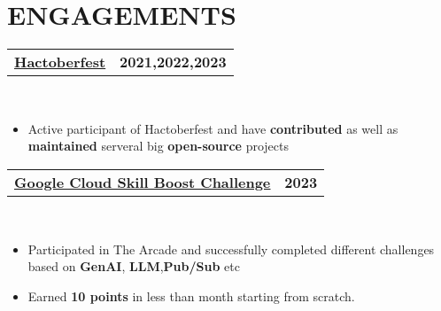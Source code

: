 \documentclass[letterpaper,11pt]{article}
\makeatletter
\newcommand{\resumeItem}[1]{
  \item\small{
    {#1 \vspace{-2pt}}
  }
}
\newcommand{\resumeProjectHeading}[2]{
    \item
    \begin{tabular*}{1.001\textwidth}{l@{\extracolsep{\fill}}r}
      \small#1 & \textbf{\small #2}\\
    \end{tabular*}\vspace{-7pt}
}
\newcommand{\resumeItemListStart}{\begin{itemize}}
\newcommand{\resumeItemListEnd}{\end{itemize}\vspace{-5pt}}
\makeatother
\begin{document}
\section{ENGAGEMENTS}
\vspace{-20pt}
 \begin{itemize}[leftmargin=0.15in, label={}]
    \small{\item{
    
    \resumeProjectHeading
    {\href{https://hacktoberfest.com}{\textbf{\large{\underline{\textbf{Hactoberfest}}}} \href{Link}{\raisebox{-0.1\height}\faExternalLink }}\large{\underline{}}}{2021,2022,2023}\\
      \resumeItemListStart
      \resumeItem{\normalsize{Active participant of Hactoberfest and have \textbf{contributed} as well as \textbf{maintained} serveral big \textbf{open-source} projects}} \\
      \resumeItemListEnd

    \resumeProjectHeading
      {\href{https://go.qwiklabs.com/arcade}{\textbf{\large{\underline{\textbf{Google Cloud Skill Boost Challenge}}}} \href{Link}{\raisebox{-0.1\height}\faExternalLink }}\large{\underline{}}}{2023}\\
      \resumeItemListStart
      \resumeItem{\normalsize{Participated in The Arcade and successfully completed different challenges based on \textbf{GenAI}, \textbf{LLM},\textbf{Pub/Sub} etc}} \\
      \resumeItem{\normalsize{Earned \textbf{10 points} in less than month starting from scratch.}} \\
      \resumeItemListEnd
    
      }}
 \end{itemize}
 \vspace{-15pt}

\end{document}
